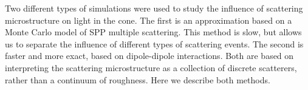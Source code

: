 Two different types of simulations were used to study the influence of
scattering microstructure on light in the cone.  The first is an
approximation based on a Monte Carlo model of SPP multiple scattering.
This method is slow, but allows us to separate the influence of different
types of scattering events.  The second is faster and more exact, based on
dipole-dipole interactions.  Both are based on interpreting the scattering
microstructure as a collection of discrete scatterers, rather than a
continuum of roughness.  Here we describe both methods.
